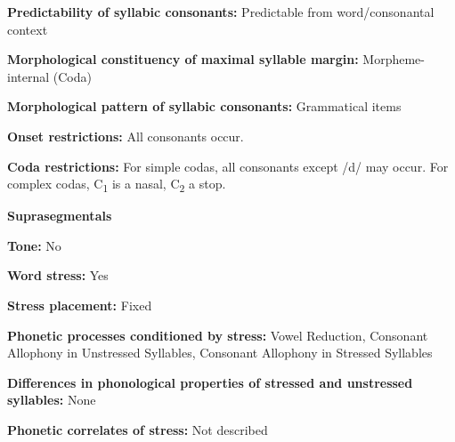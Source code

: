\begin{styleBody}
\textbf{Predictability of syllabic consonants:} Predictable from word/consonantal context
\end{styleBody}

\begin{styleBody}
\textbf{Morphological constituency of maximal syllable margin:} Morpheme-internal (Coda)
\end{styleBody}

\begin{styleBody}
\textbf{Morphological pattern of syllabic consonants:} Grammatical items
\end{styleBody}

\begin{styleBody}
\textbf{Onset restrictions: }All consonants occur.
\end{styleBody}

\begin{styleBody}
\textbf{Coda restrictions: }For simple codas, all consonants except /d/ may occur. For complex codas, C\textsubscript{1} is a nasal, C\textsubscript{2} a stop.
\end{styleBody}

\begin{styleBody}
\textbf{Suprasegmentals}
\end{styleBody}

\begin{styleBody}
\textbf{Tone:} No
\end{styleBody}

\begin{styleBody}
\textbf{Word stress:} Yes
\end{styleBody}

\begin{styleBody}
\textbf{Stress placement:} Fixed
\end{styleBody}

\begin{styleBody}
\textbf{Phonetic processes conditioned by stress:} Vowel Reduction, Consonant Allophony in Unstressed Syllables, Consonant Allophony in Stressed Syllables
\end{styleBody}

\begin{styleBody}
\textbf{Differences in phonological properties of stressed and unstressed syllables:} None
\end{styleBody}

\begin{styleBody}
\textbf{Phonetic correlates of stress: }Not described
\end{styleBody}

